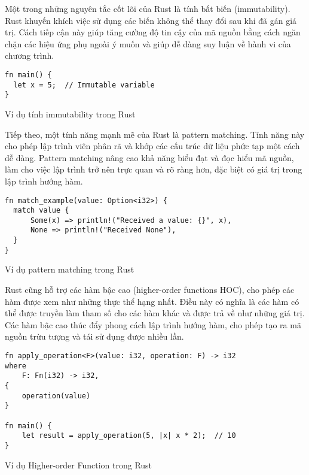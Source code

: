 Một trong những nguyên tắc cốt lõi của Rust là tính bất biến (immutability). Rust khuyến khích việc sử dụng các biến không thể thay đổi sau khi đã gán giá trị. Cách tiếp cận này giúp tăng cường độ tin cậy của mã nguồn bằng cách ngăn chặn các hiệu ứng phụ ngoài ý muốn và giúp dễ dàng suy luận về hành vi của chương trình.

\begin{listing}[H]
\begin{verbatim}
fn main() {
  let x = 5;  // Immutable variable
}
\end{verbatim}
\caption{Ví dụ tính immutability trong Rust}
\label{code:fp_immutable}
\end{listing}

Tiếp theo, một tính năng mạnh mẽ của Rust là pattern matching. Tính năng này cho phép lập trình viên phân rã và khớp các cấu trúc dữ liệu phức tạp một cách dễ dàng. Pattern matching nâng cao khả năng biểu đạt và đọc hiểu mã nguồn, làm cho việc lập trình trở nên trực quan và rõ ràng hơn, đặc biệt có giá trị trong lập trình hướng hàm.

\begin{listing}[H]
\begin{verbatim}
fn match_example(value: Option<i32>) {
  match value {
      Some(x) => println!("Received a value: {}", x),
      None => println!("Received None"),
  }
}
\end{verbatim}
\caption{Ví dụ pattern matching  trong Rust}
\label{code:fp_patternmatching}
\end{listing}

Rust cũng hỗ trợ các hàm bậc cao (higher-order functions HOC), cho phép các hàm được xem như những thực thể hạng nhất. Điều này có nghĩa là các hàm có thể được truyền làm tham số cho các hàm khác và được trả về như những giá trị. Các hàm bậc cao thúc đẩy phong cách lập trình hướng hàm, cho phép tạo ra mã nguồn trừu tượng và tái sử dụng được nhiều lần.

\begin{listing}[H]
\begin{verbatim}
fn apply_operation<F>(value: i32, operation: F) -> i32
where
    F: Fn(i32) -> i32,
{
    operation(value)
}

fn main() {
    let result = apply_operation(5, |x| x * 2);  // 10
}
\end{verbatim}
\caption{Ví dụ Higher-order Function trong Rust}
\label{code:fp_hoc}
\end{listing}

